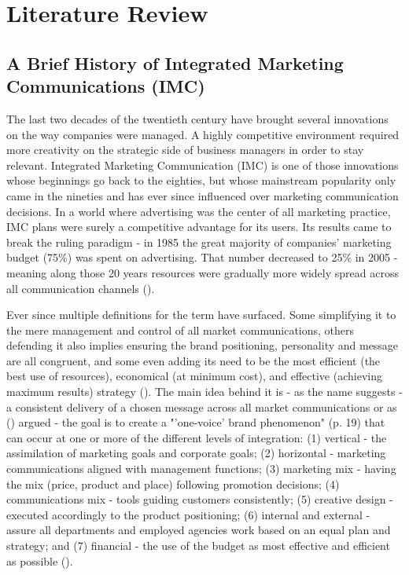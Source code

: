 \documentclass[12pt]{article}
\begin{document}
\newpage	
\section{Literature Review}\label{review}
\subsection{A Brief History of Integrated Marketing Communications (IMC)}\label{IMC}
The last two decades of the twentieth century have brought several innovations on the way companies were managed. A highly competitive environment required more creativity on the strategic side of business managers in order to stay relevant. Integrated Marketing Communication (IMC) is one of those innovations whose beginnings go back to the eighties, but whose mainstream popularity only came in the nineties and has ever since influenced over marketing communication decisions. In a world where advertising was the center of all marketing practice, IMC plans were surely a competitive advantage for its users. Its results came to break the ruling paradigm - in 1985 the great majority  of companies' marketing budget (75\%) was spent on advertising. That number decreased to 25\% in 2005 - meaning along those 20 years resources were gradually more widely spread across all communication channels (\cite{holm}).  

Ever since multiple definitions for the term have surfaced. Some simplifying it to the mere management and control of all market communications, others defending it also implies ensuring the brand positioning, personality and message are all congruent, and some even adding its need to be the most efficient (the best use of resources), economical (at minimum cost), and effective (achieving maximum results) strategy (\cite{smith}). The main idea behind it is - as the name suggests - a consistent delivery of a chosen message across all market communications or as  \citeauthor{kitchen} (\citeyear{kitchen}) argued - the goal is to create a "'one-voice' brand phenomenon" (p. 19) that can occur at one or more of the different levels of integration: (1) vertical - the assimilation of marketing goals and corporate goals; (2) horizontal - marketing communications aligned with management functions; (3) marketing mix - having the mix (price, product and place) following promotion decisions; (4) communications mix - tools guiding customers consistently; (5) creative design - executed accordingly to the product positioning; (6) internal and external - assure all departments and employed agencies work based on an equal plan and strategy; and (7) financial - the use of the budget as most effective and efficient as possible (\cite{smith}). 
\end{document}
